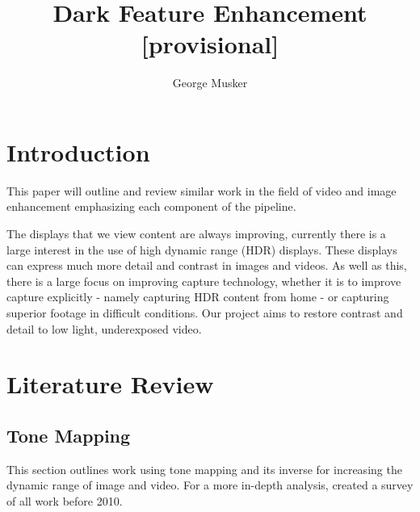 \documentclass[12pt,a4paper]{article}
\title{Dark Feature Enhancement [provisional]}
\author{George Musker}
\begin{document}
\maketitle

\section{Introduction}

	This paper will outline and review similar work in the field of video and image enhancement emphasizing each component of the pipeline. 

	The displays that we view content are always improving, currently there is a large interest in the use of high dynamic range (HDR) displays. These displays can express much more detail and contrast in images and videos. As well as this, there is a large focus on improving capture technology, whether it is to improve capture explicitly - namely capturing HDR content from home - or capturing superior footage in difficult conditions. Our project aims to restore contrast and detail to low light, underexposed video.



\section{Literature Review}

\subsection{Tone Mapping}

	This section outlines work using tone mapping and its inverse for increasing the dynamic range of image and video. For a more in-depth analysis, \cite{doi:10.1111/j.1467-8659.2009.01541.x} created a survey of all work before 2010. 
\end{document}
